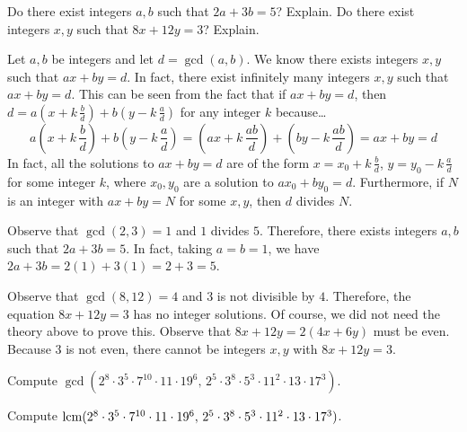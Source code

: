 \documentclass[11pt,letterpaper]{article}
\begin{document}

 Do there exist integers $a, b$ such that $2a + 3b= 5$? Explain. Do there exist integers $x, y$ such that $8x + 12y= 3$? Explain. \pspace

\sol Let $a, b$ be integers and let $d= \gcd(a, b)$. We know there exists integers $x, y$ such that $ax + by= d$. In fact, there exist infinitely many integers $x, y$ such that $ax + by= d$. This can be seen from the fact that if $ax + by= d$, then $d= a(x + k \, \frac{b}{d}) + b(y - k \, \frac{a}{d})$ for any integer $k$ because\dots
	\[
	a \left(x + k \, \frac{b}{d} \right) + b \left(y - k \, \frac{a}{d} \right)= \left( ax + k \, \dfrac{ab}{d} \right) + \left( by - k \, \dfrac{ab}{d} \right)= ax + by= d
	\]
In fact, all the solutions to $ax + by= d$ are of the form $x= x_0 + k \, \frac{b}{d}$, $y= y_0 - k \, \frac{a}{d}$ for some integer $k$, where $x_0, y_0$ are a solution to $ax_0 + by_0= d$. Furthermore, if $N$ is an integer with $ax + by= N$ for some $x, y$, then $d$ divides $N$. \pspace

Observe that $\gcd(2, 3)= 1$ and $1$ divides $5$. Therefore, there exists integers $a, b$ such that $2a + 3b= 5$. In fact, taking $a= b= 1$, we have $2a + 3b= 2(1) + 3(1)= 2 + 3= 5$. \pspace

Observe that $\gcd(8, 12)= 4$ and $3$ is not divisible by $4$. Therefore, the equation $8x + 12y= 3$ has no integer solutions. Of course, we did not need the theory above to prove this. Observe that $8x + 12y= 2(4x + 6y)$ must be even. Because $3$ is not even, there cannot be integers $x, y$ with $8x + 12y= 3$. 



\newpage



 Compute $\gcd(2^8 \cdot 3^5 \cdot 7^{10} \cdot 11 \cdot 19^6, \, 2^5 \cdot 3^8 \cdot 5^3 \cdot 11^2 \cdot 13 \cdot 17^3)$. \pspace





\newpage





 Compute $\operatorname{lcm}(2^8 \cdot 3^5 \cdot 7^{10} \cdot 11 \cdot 19^6, \, 2^5 \cdot 3^8 \cdot 5^3 \cdot 11^2 \cdot 13 \cdot 17^3)$. \pspace





\newpage
\end{document}
